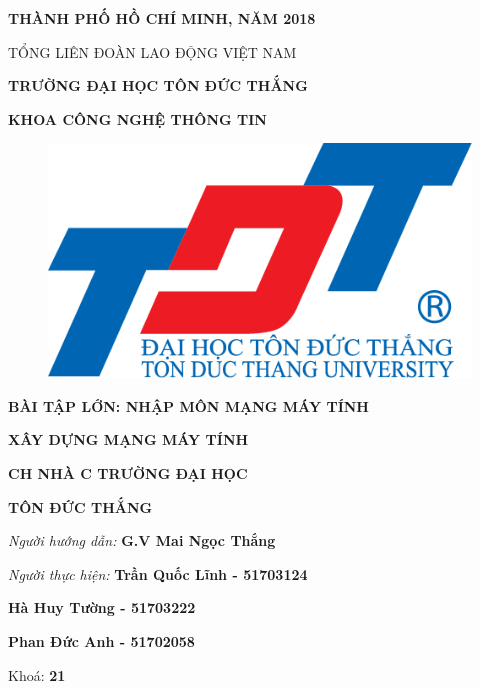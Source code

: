 \documentclass{report}
\begin{document}
\vspace{1cm}
\changefontsizes{14pt}
\centerline{\textbf{THÀNH PHỐ HỒ CHÍ MINH, NĂM 2018}}


\newpage
\changefontsizes[14pt]{12pt}
\centerline{TỔNG LIÊN ĐOÀN LAO ĐỘNG VIỆT NAM}

\changefontsizes[14pt]{11pt}
\centerline{\textbf{TRƯỜNG ĐẠI HỌC TÔN ĐỨC THẮNG}}
\centerline{\textbf{KHOA CÔNG NGHỆ THÔNG TIN}}

\begin{center}
    \begin{figure}[htp]
    \begin{center}
     \includegraphics[scale=.2]{logo}
    \end{center}
    \end{figure}
\end{center}

\changefontsizes{16pt}
\centerline{\textbf{BÀI TẬP LỚN: NHẬP MÔN MẠNG MÁY TÍNH}}
\vspace{1.5cm}
\changefontsizes{24pt}
\centerline{\textbf{XÂY DỰNG MẠNG MÁY TÍNH}}
\centerline{\textbf{CH NHÀ C TRƯỜNG ĐẠI HỌC}}
\centerline{\textbf{TÔN ĐỨC THẮNG}}

\vspace{4cm}
\begin{flushright}
\renewcommand{\baselinestretch}{0.05}
\changefontsizes{14pt}
\textit{Người hướng dẫn: }\textbf{G.V Mai Ngọc Thắng}
\setlength{\parskip}{0.5em}

\textit{Người thực hiện: }\textbf{Trần Quốc Lĩnh - 51703124}
\setlength{\parskip}{0.5em}

\textit{}\textbf{Hà Huy Tường - 51703222}
\setlength{\parskip}{0.5em}

\textit{}\textbf{Phan Đức Anh - 51702058}
\setlength{\parskip}{0.75em}


Khoá: \textbf{21}
\setlength{\parskip}{0.5em}

\end{flushright}
\end{document}
